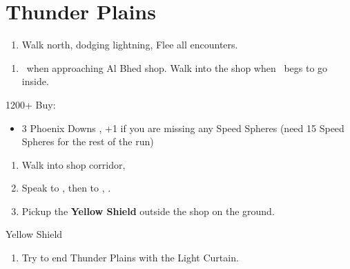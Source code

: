 \chapter{Thunder Plains}

\begin{enumerate}
    \item Walk north, dodging lightning, Flee all encounters.
\end{enumerate}
\begin{enumerate}[resume]
    \item \sd\ when approaching Al Bhed shop. Walk into the shop when \rikku\ begs to go inside.
\end{enumerate}
\begin{shop}{1200+}
    Buy:
    \begin{itemize}
        \item 3 Phoenix Downs
        , +1 if you are missing any Speed Spheres (need 15 Speed Spheres for the rest of the run)
    \end{itemize}
\end{shop}
\begin{enumerate}[resume]
    \item Walk into shop corridor, \cs[2:00]
    \item Speak to \auron, then to \rikku, \sd.
    \item Pickup the \textbf{Yellow Shield} outside the shop on the ground.
\end{enumerate}
\begin{equip}
    \begin{itemize}
        \tidusf Yellow Shield
    \end{itemize}
\end{equip}
\begin{enumerate}[resume]
    \item Try to end Thunder Plains with the Light Curtain.
\end{enumerate}
